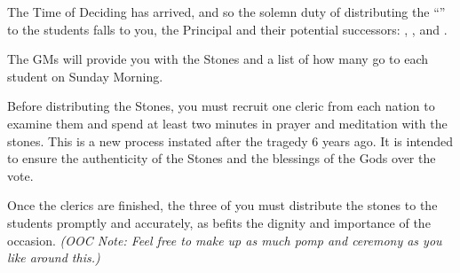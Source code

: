 \documentclass[green]{GL2020}
\begin{document}
\name{\gPassingOutVotes{}}

The Time of Deciding has arrived, and so the solemn duty of distributing the ``\iVotingStones{}'' to the students falls to you, the Principal and their potential successors: \cPrincipal{\full}, \cMusic{\full}, and \cBeetle{\full}.

The GMs will provide you with the Stones and a list of how many go to each student on Sunday Morning. 

Before distributing the Stones, you must recruit one cleric from each nation to examine them and spend at least two minutes in prayer and meditation with the stones. This is a new process instated after the tragedy 6 years ago. It  is intended to ensure the authenticity of the Stones and the blessings of the Gods over the vote. 

Once the clerics are finished, the three of you must distribute the stones to the students promptly and accurately, as befits the dignity and importance of the occasion. \emph{(OOC Note: Feel free to make up as much pomp and ceremony as you like around this.)}
\end{document}
